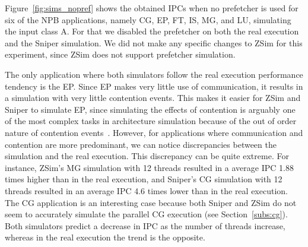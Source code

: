 \documentclass[AMA,final,STIX1COL]{WileyNJD-v2}
\newcommand{\fbm}[1]{\textcolor{red}{\bfseries \ul{fbm: #1} }\vspace{0.2cm}}
\begin{document}
Figure~\ref{fig:sims_nopref} shows the obtained IPCs when no prefetcher is used for six of the NPB applications, namely CG, EP, FT, IS, MG, and LU, simulating the input class A.
For that we disabled the prefetcher on both the real execution and the Sniper simulation. 
We did not make any specific changes to ZSim for this experiment, since ZSim does not support prefetcher simulation.


The only application where both simulators follow the real execution performance tendency is the EP. Since EP makes very little use of communication, it results in a simulation with very little contention events. 
This makes it easier for ZSim and Sniper to simulate EP, since simulating the effects of contention is arguably one of the most complex tasks in architecture simulation because of the out of order nature of contention events~\cite{sanchez2013zsim}.
However, for applications where communication and contention are more predominant, we can notice discrepancies between the simulation and the real execution. 
This discrepancy can be quite extreme. For instance, ZSim's MG simulation with 12 threads resulted in a average IPC 1.88 times higher than in the real execution, and Sniper's CG simulation with 12 threads resulted in an average IPC 4.6 times lower than in the real execution. 
The CG application is an interesting case because both Sniper and ZSim do not seem to accurately simulate the parallel CG execution (see Section~\ref{subs:cg}).
Both simulators predict a decrease in IPC as the number of threads increase, whereas in the real execution the trend is the opposite.
\end{document}
